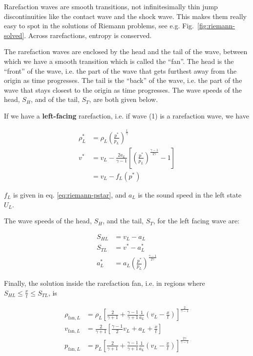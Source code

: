 Rarefaction waves are smooth transitions, not infinitesimally thin jump
discontinuities like the contact wave and the shock wave. This makes them
really easy to spot in the solutions of Riemann problems, see e.g.
Fig.~\ref{fig:riemann-solved}. Across rarefactions, entropy is conserved.

The rarefaction waves are enclosed by the head and the tail of the wave,
between which we have a smooth transition which is called the ``fan''. The head
is the ``front'' of the wave, i.e. the part of the wave that gets furthest away
from the origin as time progresses. The tail is the ``back'' of the wave, i.e.
the part of the wave that stays closest to the origin as time progresses.
The wave speeds of the head, $S_H$, and of the tail, $S_T$, are both given
below.


If we have a \textbf{left-facing} rarefaction, i.e. if wave (1) is a rarefaction
wave, we have

\begin{align}
\rho^*_L &=
	\rho_L \left( \frac{p^*}{p_L} \right) ^ \frac{1}{\gamma}\\
v^* &=
	v_L - \frac{2 a_L}{\gamma - 1} \left[
		\left( \frac{p^*}{p_L} \right) ^ \frac{\gamma - 1}{2 \gamma} -1
	\right]\\
	& = v_L - f_L(p^*)
\end{align}

$f_{L}$ is given in eq. \ref{eq:riemann-pstar}, and $a_L$ is the sound speed in
the left state $U_L$.


The wave speeds of the head, $S_H$, and the tail, $S_T$, for the left facing
wave are:

\begin{align}
	S_{HL} &= v_L - a_L\\
	S_{TL} &= v^* - a^*_L\\
	a^*_L  &= a_L \left( \frac{p^*}{p_L} \right) ^ \frac{\gamma - 1}{2 \gamma}
\end{align}


Finally, the solution inside the rarefaction fan, i.e. in regions where $S_{HL}
\leq \frac{x}{t} \leq S_{TL}$, is

\begin{align}
\rho_{\text{fan}, L} &=
	\rho_L \left[
		\frac{2}{\gamma + 1} +
		\frac{\gamma - 1}{\gamma + 1}
		\frac{1}{a_L}
		\left(v_L - \frac{x}{t}\right)
	\right] ^ \frac{2}{\gamma -1 }
	\label{eq:rho-rarefaction-fan-left}\\
v_{\text{fan}, L} &=
	\frac{2}{\gamma + 1} \left[
		\frac{\gamma - 1}{2} v_L + a_L + \frac{x}{t}
	\right] \\
p_{\text{fan}, L} &=
	p_L \left[
		\frac{2}{\gamma + 1} +
		\frac{\gamma - 1}{\gamma + 1}
		\frac{1}{a_L}
		\left(v_L - \frac{x}{t}\right)
	\right] ^ \frac{2 \gamma}{\gamma -1}
	\label{eq:pressure-rarefaction-fan-left}
\end{align}









